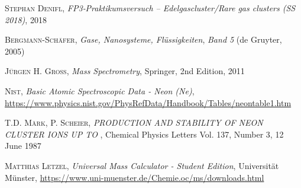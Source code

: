 \documentclass[a4paper,10pt]{article}
\begin{document}
\begin{thebibliography}{99}

\textsc{Stephan Denifl}, \textit{FP3‐Praktikumsversuch – Edelgascluster/Rare gas clusters (SS 2018)}, 2018

\textsc{Bergmann-Schäfer}, \textit{Gase, Nanosysteme, Flüssigkeiten}, \textit{Band 5} (de Gruyter, 2005)

\textsc{Jürgen H. Gross}, \textit{Mass Spectrometry}, Springer, 2nd Edition, 2011

\textsc{Nist}, \textit{Basic Atomic Spectroscopic Data - Neon (Ne)}, \url{https://www.physics.nist.gov/PhysRefData/Handbook/Tables/neontable1.htm}

\textsc{T.D. Märk, P. Scheier}, \textit{PRODUCTION AND STABILITY OF NEON CLUSTER IONS UP TO } , Chemical Physics Letters Vol. 137, Number 3, 12 June 1987

\textsc{Matthias Letzel}, \textit{Universal Mass Calculator - Student Edition}, Universität Münster, \url{https://www.uni-muenster.de/Chemie.oc/ms/downloads.html}
\end{thebibliography}
\end{document}
